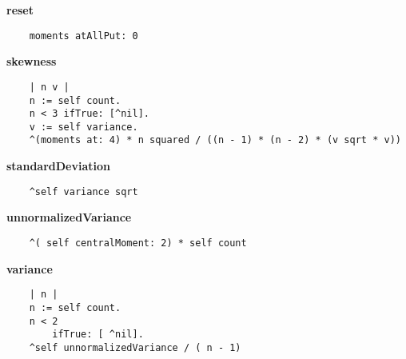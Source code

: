 {\bf reset}
\begin{verbatim}
    moments atAllPut: 0

\end{verbatim}
{\bf skewness}
\begin{verbatim}
    | n v |
    n := self count.
    n < 3 ifTrue: [^nil].
    v := self variance.
    ^(moments at: 4) * n squared / ((n - 1) * (n - 2) * (v sqrt * v))

\end{verbatim}
{\bf standardDeviation}
\begin{verbatim}
    ^self variance sqrt

\end{verbatim}
{\bf unnormalizedVariance}
\begin{verbatim}
    ^( self centralMoment: 2) * self count

\end{verbatim}
{\bf variance}
\begin{verbatim}
    | n |
    n := self count.
    n < 2
        ifTrue: [ ^nil].
    ^self unnormalizedVariance / ( n - 1)

\end{verbatim}

